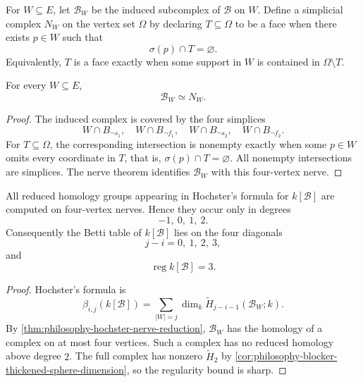 \begin{definition}
\label{def:philosophy-induced-blocker-nerve}
For $W\subseteq E$, let $\mathcal{B}_{W}$ be the induced subcomplex of
$\mathcal{B}$ on $W$. Define a simplicial complex $N_{W}$ on the
vertex set $\Omega$ by declaring $T\subseteq\Omega$ to be a face when
there exists $p\in W$ such that
$$
  \sigma(p)\cap T=\varnothing.
$$
Equivalently, $T$ is a face exactly when some support in $W$ is
contained in $\Omega\setminus T$.
\end{definition}

\begin{theorem}
\label{thm:philosophy-hochster-nerve-reduction}
For every $W\subseteq E$,
$$
  \mathcal{B}_{W}\simeq N_{W}.
$$
\end{theorem}
\begin{proof}
The induced complex is covered by the four simplices
$$
  W\cap B_{\neg s_{1}},
  \quad
  W\cap B_{\neg f_{1}},
  \quad
  W\cap B_{\neg s_{2}},
  \quad
  W\cap B_{\neg f_{2}}.
$$
For $T\subseteq\Omega$, the corresponding intersection is nonempty
exactly when some $p\in W$ omits every coordinate in $T$, that is,
$\sigma(p)\cap T=\varnothing$. All nonempty intersections are
simplices. The nerve theorem identifies $\mathcal{B}_{W}$ with this
four-vertex nerve.
\end{proof}

\begin{corollary}
\label{cor:philosophy-hochster-homology-range}
All reduced homology groups appearing in Hochster's formula for
$k[\mathcal{B}]$ are computed on four-vertex nerves. Hence they occur
only in degrees
$$
  -1,\ 0,\ 1,\ 2.
$$
Consequently the Betti table of $k[\mathcal{B}]$ lies on the four
diagonals
$$
  j-i=0,\ 1,\ 2,\ 3,
$$
and
$$
  \operatorname{reg}k[\mathcal{B}]=3.
$$
\end{corollary}
\begin{proof}
Hochster's formula is
$$
  \beta_{i,j}(k[\mathcal{B}])
  =
  \sum_{|W|=j}
  \dim_{k}\widetilde{H}_{j-i-1}(\mathcal{B}_{W};k).
$$
By \autoref{thm:philosophy-hochster-nerve-reduction},
$\mathcal{B}_{W}$ has the homology of a complex on at most four
vertices. Such a complex has no reduced homology above degree $2$.
The full complex has nonzero $\widetilde{H}_{2}$ by
\autoref{cor:philosophy-blocker-thickened-sphere-dimension}, so the
regularity bound is sharp.
\end{proof}

